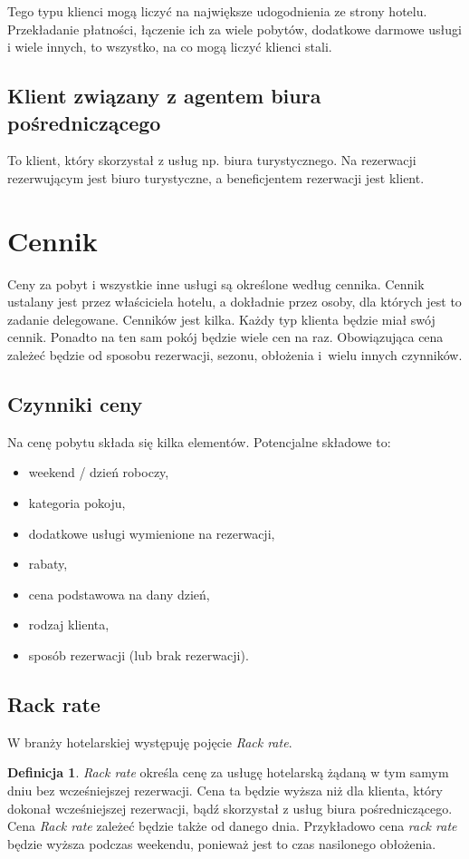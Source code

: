\documentclass[a4paper,onecolumn,oneside,11pt,wide,floatssmall]{mwrep}
\theoremstyle{definition}
\newtheorem{defn}{Definicja}[section]
\theoremstyle{plain}%
\theoremstyle{remark}
\begin{document}
Tego typu klienci mogą liczyć na największe udogodnienia ze strony hotelu. 
Przekładanie płatności, łączenie ich za wiele pobytów, dodatkowe darmowe 
usługi i wiele innych, to wszystko, na co mogą liczyć klienci stali.

\subsection{Klient związany z agentem biura pośredniczącego}
To klient, który skorzystał z usług np. biura turystycznego. Na rezerwacji 
rezerwującym jest biuro turystyczne, a beneficjentem rezerwacji jest klient.

\section{Cennik}
Ceny za pobyt i wszystkie inne usługi są określone według cennika. Cennik 
ustalany jest przez właściciela hotelu, a dokładnie przez osoby, dla których 
jest to zadanie delegowane. Cenników jest kilka. Każdy typ klienta będzie 
miał swój cennik. Ponadto na ten sam pokój będzie wiele cen na raz. 
Obowiązująca cena zależeć będzie od sposobu rezerwacji, sezonu, obłożenia \mbox{i 
wielu} innych czynników.

\subsection{Czynniki ceny}
Na cenę pobytu składa się kilka elementów. Potencjalne składowe to:
\begin{itemize}
  \item weekend / dzień roboczy,
  \item kategoria pokoju,
  \item dodatkowe usługi wymienione na rezerwacji,
  \item rabaty,
  \item cena podstawowa na dany dzień,
  \item rodzaj klienta,
  \item sposób rezerwacji (lub brak rezerwacji).
\end{itemize}

\subsection{Rack rate}
W branży hotelarskiej występuję pojęcie \emph{Rack rate}.

\begin{defn}{\emph{Rack rate}}
określa cenę za usługę hotelarską żądaną w tym samym dniu bez wcześniejszej 
rezerwacji. Cena ta będzie wyższa niż dla klienta, który dokonał 
wcześniejszej rezerwacji, bądź skorzystał z usług biura pośredniczącego. 
Cena \emph{Rack rate} zależeć będzie także od danego dnia. Przykładowo cena \emph{rack 
rate} będzie wyższa podczas weekendu, ponieważ jest to czas nasilonego 
obłożenia.
\end{defn}
\end{document}
